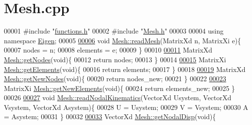 \hypertarget{_mesh_8cpp_source}{}\section{Mesh.\+cpp}
\label{_mesh_8cpp_source}

\begin{DoxyCode}
00001 \textcolor{preprocessor}{#include "\hyperlink{functions_8h}{functions.h}"}
00002 \textcolor{preprocessor}{#include "\hyperlink{_mesh_8h}{Mesh.h}"}
00003 
00004 \textcolor{keyword}{using namespace }\hyperlink{namespace_eigen}{Eigen};
00005 
\hyperlink{class_mesh_aba57df50d740f660cadf00aefe75e157}{00006} \textcolor{keywordtype}{void} \hyperlink{class_mesh_aba57df50d740f660cadf00aefe75e157}{Mesh::readMesh}(MatrixXd n, MatrixXi e)\{
00007     nodes = n;
00008     elements = e;
00009 \}
00010 
\hyperlink{class_mesh_a0b0f7458f07745240d9bda967cda12de}{00011} MatrixXd \hyperlink{class_mesh_a0b0f7458f07745240d9bda967cda12de}{Mesh::getNodes}(\textcolor{keywordtype}{void})\{
00012     \textcolor{keywordflow}{return} nodes;
00013 \}
00014 
\hyperlink{class_mesh_a4828631f942fd5a701870beea870f413}{00015} MatrixXi \hyperlink{class_mesh_a4828631f942fd5a701870beea870f413}{Mesh::getElements}(\textcolor{keywordtype}{void})\{
00016     \textcolor{keywordflow}{return} elements;
00017 \}
00018 
\hyperlink{class_mesh_a52ecce406bbef80cbf3610db3ea5ea40}{00019} MatrixXd \hyperlink{class_mesh_a52ecce406bbef80cbf3610db3ea5ea40}{Mesh::getNewNodes}(\textcolor{keywordtype}{void})\{
00020     \textcolor{keywordflow}{return} nodes\_new;
00021 \}
00022 
\hyperlink{class_mesh_a6e425e9499e64ab52c4555aa3763651d}{00023} MatrixXi \hyperlink{class_mesh_a6e425e9499e64ab52c4555aa3763651d}{Mesh::getNewElements}(\textcolor{keywordtype}{void})\{
00024     \textcolor{keywordflow}{return} elements\_new;
00025 \}
00026 
\hyperlink{class_mesh_a2193a797388525febbac794d17bea23e}{00027} \textcolor{keywordtype}{void} \hyperlink{class_mesh_a2193a797388525febbac794d17bea23e}{Mesh::readNodalKinematics}(VectorXd Usystem, VectorXd Vsystem, VectorXd 
      Asystem)\{
00028     U = Usystem;
00029     V = Vsystem;
00030     A = Asystem;
00031 \}
00032 
\hyperlink{class_mesh_a3fbc4b3c21f738efc6cdf3d02e31ad23}{00033} VectorXd \hyperlink{class_mesh_a3fbc4b3c21f738efc6cdf3d02e31ad23}{Mesh::getNodalDisp}(\textcolor{keywordtype}{void})\{

\end{DoxyCode}
